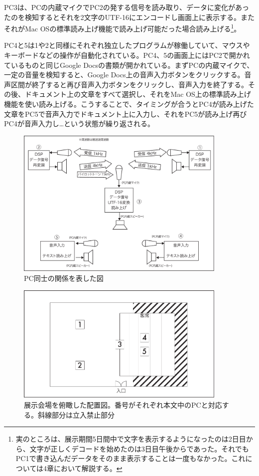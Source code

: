 \documentclass[a4paper,report]{jsbook}
\begin{document}
PC3は、PCの内蔵マイクでPC2の発する信号を読み取り、データに変化があったのを検知するとそれを2文字のUTF-16にエンコードし画面上に表示する。またそれがMac
OSの標準読み上げ機能で読み上げ可能だった場合読み上げる\footnote{実のところは、展示期間5日間中で文字を表示するようになったのは2日目から、文字が正しくデコードを始めたのは3日目午後からであった。それでもPC1で書き込んだデータをそのまま表示することは一度もなかった。これについては4章において解説する。}。

PC4と5は1や2と同様にそれぞれ独立したプログラムが稼働していて、マウスやキーボードなどの操作が自動化されている。PC4、5の画面上にはPC2で開かれているものと同じGoogle
Docsの書類が開かれている。まずPCの内蔵マイクで、一定の音量を検知すると、Google
Docs上の音声入力ボタンをクリックする。音声区間が終了すると再び音声入力ボタンをクリックし、音声入力を終了する。その後、ドキュメント上の文章をすべて選択し、それをMac
OS上の標準読み上げ機能を使い読み上げる。こうすることで、タイミングが合うとPC4が読み上げた文章をPC5で音声入力でドキュメント上に入力し、それをPC5が読み上げ再びPC4が音声入力し\ldots{}という状態が繰り返される。

\begin{figure}[htbp]
\centering
\includegraphics[width=0.90000\textwidth]{./img/adm2_setsumei.pdf}
\caption{PC同士の関係を表した図\label{fig:setsumei}}
\end{figure}

\begin{figure}[htbp]
\centering
\includegraphics[width=0.90000\textwidth]{./img/place.pdf}
\caption{展示会場を俯瞰した配置図。番号がそれぞれ本文中のPCと対応する。斜線部分は立入禁止部分\label{fig:fukan}}
\end{figure}
\end{document}

